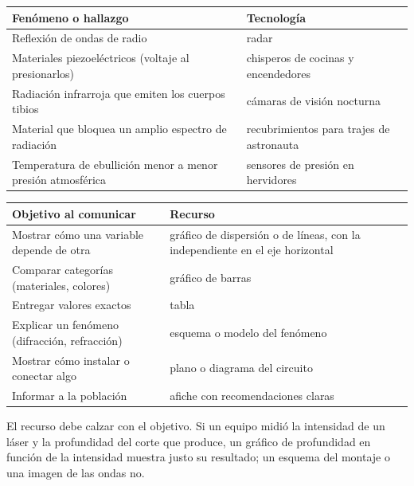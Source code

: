  
\begin{center}\small
\begin{tabularx}{\linewidth}{@{}>{\raggedright\arraybackslash\hsize=1.00\hsize}X>{\raggedright\arraybackslash\hsize=1.00\hsize}X@{}}
\toprule
\textbf{Fenómeno o hallazgo} & \textbf{Tecnología} \\
\midrule
Reflexión de ondas de radio & radar \\
Materiales piezoeléctricos (voltaje al presionarlos) & chisperos de cocinas y encendedores \\
Radiación infrarroja que emiten los cuerpos tibios & cámaras de visión nocturna \\
Material que bloquea un amplio espectro de radiación & recubrimientos para trajes de astronauta \\
Temperatura de ebullición menor a menor presión atmosférica & sensores de presión en hervidores \\
\bottomrule
\end{tabularx}
\end{center}
  
\begin{center}\small
\begin{tabularx}{\linewidth}{@{}>{\raggedright\arraybackslash\hsize=1.00\hsize}X>{\raggedright\arraybackslash\hsize=1.00\hsize}X@{}}
\toprule
\textbf{Objetivo al comunicar} & \textbf{Recurso} \\
\midrule
Mostrar cómo una variable depende de otra & gráfico de dispersión o de líneas, con la independiente en el eje horizontal \\
Comparar categorías (materiales, colores) & gráfico de barras \\
Entregar valores exactos & tabla \\
Explicar un fenómeno (difracción, refracción) & esquema o modelo del fenómeno \\
Mostrar cómo instalar o conectar algo & plano o diagrama del circuito \\
Informar a la población & afiche con recomendaciones claras \\
\bottomrule
\end{tabularx}
\end{center}
 
\begin{clave}[{Recuerda}] El recurso debe calzar con el objetivo. Si un equipo midió la intensidad de un láser y la profundidad del corte que produce, un gráfico de profundidad en función de la intensidad muestra justo su resultado; un esquema del montaje o una imagen de las ondas no.\end{clave}
